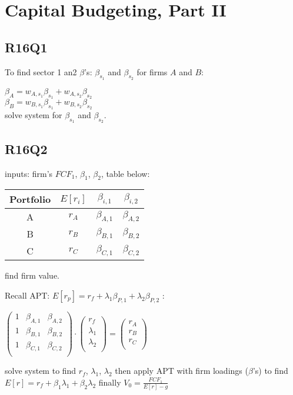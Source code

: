 \section{Capital Budgeting, Part II}

\subsection*{R16Q1}
To find sector 1 an2 $\beta$'s: $\beta_{s_1}$ and $\beta_{s_2}$ for firms $A$ and $B$:

$\beta_{A} = w_{A,s_1} \beta_{s_1} +  w_{A,s_2}  \beta_{s_2}  $ \\
$\beta_{B} = w_{B,s_1} \beta_{s_1} +  w_{B,s_2}  \beta_{s_2}  $ \\

solve system for  $\beta_{s_1}$ and $\beta_{s_2}$.

\subsection*{R16Q2}

inputs: firm's $FCF_1$,  $\beta_1$, $\beta_2$, table below:
\begin{center}
	\begin{tabular}{ |c|c|c|c| } 
		\hline
		Portfolio & $E[r_i]$ & $\beta_{i,1}$ & $\beta_{i,2}$ \\ 
		\hline
		A & $r_A$ & $\beta_{A,1}$ &  $\beta_{A,2}$ \\ 
		B & $r_B$ & $\beta_{B,1}$ &  $\beta_{B,2}$ \\ 
		C & $r_C$ & $\beta_{C,1}$ &  $\beta_{C,2}$ \\ 
		\hline
	\end{tabular}
\end{center}

find firm value.

Recall APT: $E[r_p] = r_f + \lambda_1 \beta_{P,1} + \lambda_2 \beta_{P,2}$ :


$
\begin{pmatrix}
	1 & \beta_{A,1} &  \beta_{A,2} \\
	1 & \beta_{B,1} &  \beta_{B,2} \\
	1 & \beta_{C,1} &  \beta_{C,2} \\							
\end{pmatrix} \cdot 
\begin{pmatrix}
	r_f \\
	\lambda_1 \\
	\lambda_2 \\								
\end{pmatrix}	
=
\begin{pmatrix}
	r_A \\
	r_B \\
	r_C \\								
\end{pmatrix}
$
 
solve system to find $r_f$, $\lambda_1$, $\lambda_2$ then apply APT with firm loadings ($\beta$'s) to find $E[r]=r_f+\beta_1 \lambda_1 + \beta_2 \lambda_2 $ finally $V_0 = \frac{FCF_1}{E[r]-g}$
